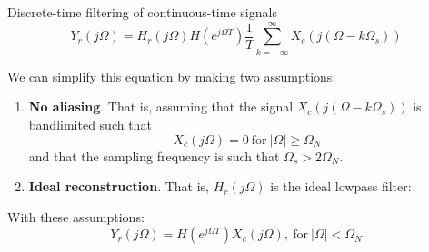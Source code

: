 \documentclass[10pt, aspectratio=169]{beamer}
\begin{document}
\begin{frame}{Discrete-time filtering of continuous-time signals}	
	\begin{equation*}
		Y_r(j\Omega) = H_r(j\Omega)H(e^{j\Omega T})\frac{1}{T}\sum_{k=-\infty}^{\infty}X_c(j(\Omega - k\Omega_s)) \label{eq:ct-dt-dsp}
	\end{equation*}
	
	We can simplify this equation by making two assumptions:
	\begin{enumerate}
		\item \textbf{No aliasing}. That is, assuming that the signal $X_c(j(\Omega - k\Omega_s))$ is bandlimited such that
		\begin{equation*}
			X_c(j\Omega) = 0~\text{for}~|\Omega| \geq \Omega_N
		\end{equation*}
		and that the sampling frequency is such that $\Omega_s > 2\Omega_N$.
		\item \textbf{Ideal reconstruction}. That is, $H_r(j\Omega)$ is the ideal lowpass filter:
	\end{enumerate}
	
	With these assumptions:
	\begin{equation*}
	Y_r(j\Omega) = H(e^{j\Omega T})X_c(j\Omega),~\text{for}~|\Omega| < \Omega_N
	\end{equation*}

\end{frame}
\end{document}
